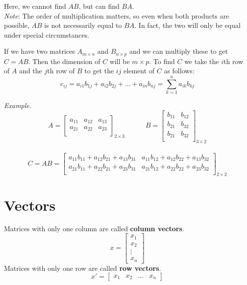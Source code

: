 \documentclass{./../Latex/handout}
\begin{document}
Here, we cannot find $AB$, but can find $BA$. \\

\textit{Note}: The order of multiplication matters, so even when both products are possible, $AB$ is not necessarily equal to $BA$. In fact, the two will only be equal under special circumstances. 

If we have two matrices $A_{m \times n}$ and $B_{n \times p}$ and we can multiply these to get $C=AB$. Then the dimension of $C$ will be $m \times p$. To find $C$ we take the $i$th row of $A$ and the $j$th row of $B$ to get the $ij$ element of $C$ as follows:
$$ c_{ij} = a_{i1} b_{1j} + a_{i2} b_{2j} + ... + a_{in} b_{nj} = \sum_{k=1}^n a_{ik} b_{kj}   $$

\textit{Example.}
$$A = \begin{bmatrix}
a_{11} & a_{12} &  a_{13} \\
a_{21} & a_{22} &  a_{23} \\
\end{bmatrix}_{2 \times 3} \quad \quad \quad
B = \begin{bmatrix}
b_{11} & b_{12} \\
b_{21} & b_{32} \\
b_{21} & b_{32} \\
\end{bmatrix}_{3 \times 2}$$ \\
$$C = AB = \begin{bmatrix}
 a_{11}b_{11} +  a_{12}b_{21} + a_{13}b_{31} &  a_{11}b_{12} +  a_{12}b_{22} + a_{13}b_{32} \\
  a_{21}b_{11} +  a_{22}b_{21} + a_{23}b_{31} &  a_{21}b_{12} +  a_{22}b_{22} + a_{23}b_{32} \\
\end{bmatrix}_{2 \times 2} $$


\section{Vectors}

Matrices with only one column are called \textbf{column vectors}. 
$$ x =  \begin{bmatrix}
x_1\\
x_2 \\
\vdots \\
x_n
\end{bmatrix} $$
 Matrices with only one row are called \textbf{row vectors}.
$$ x' =  \begin{bmatrix}
x_1 &
x_2 & \hdots &
x_n
\end{bmatrix} $$
\end{document}
